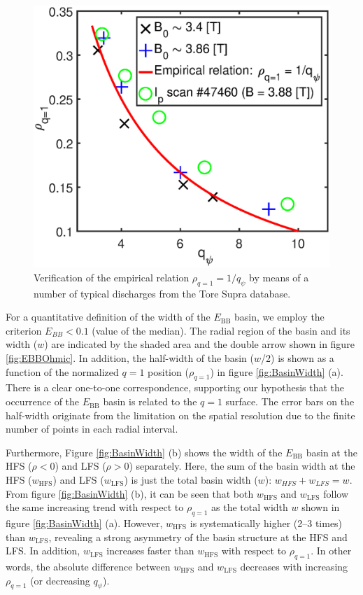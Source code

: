 \begin{figure}[h]
\begin{centering}
\includegraphics[scale=0.45]{fig_rq1.eps}
\par\end{centering}
\caption{Verification of the empirical relation $\rho_{q=1}=1/q_{\psi}$ by means of a number of typical discharges from the Tore Supra database.}
\label{fig:rq1}
\end{figure}


For a quantitative definition of the width of the $E_\mathrm{BB}$ basin, we employ the criterion $E_{BB}<0.1$ (value of the median). The radial region of the basin and its width ($w$) are indicated by the shaded area and the double arrow shown in figure \ref{fig:EBBOhmic}. In addition, the half-width of the basin ($w$/2) is shown as a function of the normalized $q = 1$ position ($\rho_{q=1}$) in figure \ref{fig:BasinWidth} (a). There is a clear one-to-one correspondence, supporting our hypothesis that the occurrence of the $E_\mathrm{BB}$ basin is related to the $q = 1$ surface. The error bars on the half-width originate from the limitation on the spatial resolution due to the finite number of points in each radial interval.

Furthermore, Figure \ref{fig:BasinWidth} (b) shows the width of the $E_\mathrm{BB}$ basin at the HFS ($\rho < 0$) and LFS ($\rho > 0$) separately. Here, the sum of the basin width at the HFS ($w_\mathrm{HFS}$) and LFS ($w_\mathrm{LFS}$) is just the total basin width ($w$): $w_{HFS}+w_{LFS}=w$. From figure \ref{fig:BasinWidth} (b), it can be seen that both $w_\mathrm{HFS}$ and $w_\mathrm{LFS}$ follow the same increasing trend with respect to $\rho_{q=1}$ as the total width $w$ shown in figure \ref{fig:BasinWidth} (a). However, $w_\mathrm{HFS}$ is systematically higher (2--3 times) than $w_\mathrm{LFS}$, revealing a strong asymmetry of the basin structure at the HFS and LFS. In addition, $w_\mathrm{LFS}$ increases faster than $w_\mathrm{HFS}$ with respect to $\rho_{q=1}$. In other words, the absolute difference between $w_\mathrm{HFS}$ and $w_\mathrm{LFS}$ decreases with increasing $\rho_{q=1}$ (or decreasing $q_{\psi}$).


